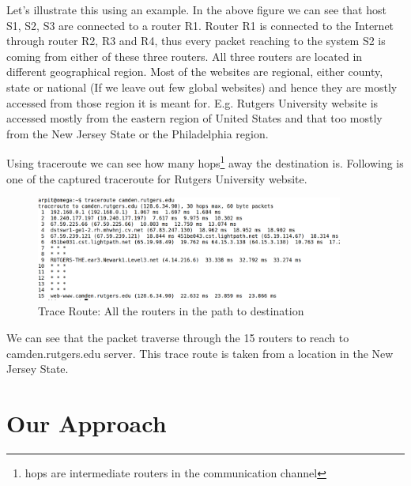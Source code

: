 \documentclass[12pt,oneside,a4paper]{article}
\begin{document}
Let's illustrate this using an example. In the above figure we can see that host S1, S2, S3 are connected to a router R1. Router R1 is connected to the Internet through router R2, R3 and R4, thus every packet reaching to the system S2 is coming from either of these three routers. All three routers are located in different geographical region. Most of the websites are regional, either county, state or national (If we leave out few global websites) and hence they are mostly accessed from those region it is meant for. E.g. Rutgers University website is accessed mostly from the eastern region of United States and that too mostly from the New Jersey State or the Philadelphia region.\par
Using traceroute we can see how many hops\footnote{hops are intermediate routers in the communication channel} away the destination is. Following is one of the captured traceroute for Rutgers University website.\par
\begin{figure}[H]
\centering
\includegraphics[width=0.90\textwidth]{TraceRoute.png}
\caption{Trace Route: All the routers in the path to destination} \label{fig:traceroute}
\end{figure}

We can see that the packet traverse through the 15 routers to reach to camden.rutgers.edu server. This trace route is taken from a location in the New Jersey State.\par

\section{Our Approach}
\end{document}

